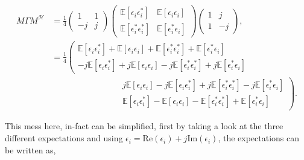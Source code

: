 \documentclass[honours,12pt]{unswthesis}
\newcommand{\E}{\mathbb{E}}
\newcommand{\ct}{\mathcal{H}}
\numberwithin{equation}{section}
\begin{document}
\begin{align*}
	M \Gamma M^{\ct} &= \frac{1}{4} \begin{pmatrix}
		1 & 1 \\
		- j & j
	\end{pmatrix}
	\begin{pmatrix}
		\E \left[
			\epsilon_{i} \epsilon_{i}^{*}
		\right] &
		\E \left[
			\epsilon_{i} \epsilon_{i}
		\right] \\
		\E \left[
			\epsilon_{i}^{*} \epsilon_{i}^{*}
		\right] &
		\E \left[
			\epsilon_{i}^{*} \epsilon_{i}
		\right]
	\end{pmatrix}
	\begin{pmatrix}
		1 & j \\
		1 & - j 
	\end{pmatrix},\\
	&= \frac{1}{4} \left( \begin{matrix}
		\E \left[
		    \epsilon_{i} \epsilon_{i}^{*}
		\right] + 
		\E \left[
		    \epsilon_{i} \epsilon_{i}
		\right] + 
		\E \left[
		    \epsilon_{i}^{*} \epsilon_{i}^{*}
		\right] +
		\E \left[
		    \epsilon_{i}^{*} \epsilon_{i}
		\right] \\
		- j \E \left[
		    \epsilon_{i} \epsilon_{i}^{*}
		\right] + 
		j \E \left[
		    \epsilon_{i} \epsilon_{i}
		\right] - 
		j \E \left[
		    \epsilon_{i}^{*} \epsilon_{i}^{*}
		\right] +
		j \E \left[
		    \epsilon_{i}^{*} \epsilon_{i}
		\right]
		\end{matrix}\right.\\
		&\qquad \qquad \qquad \qquad \left. \begin{matrix}
		j \E \left[
		    \epsilon_{i} \epsilon_{i}
		\right] - 
		j \E \left[
		    \epsilon_{i} \epsilon_{i}^{*}
		\right] + 
		j \E \left[
		    \epsilon_{i}^{*} \epsilon_{i}^{*}
		\right] -
		j \E \left[
		    \epsilon_{i}^{*} \epsilon_{i}
		\right] \\
		\E \left[
		    \epsilon_{i} \epsilon_{i}^{*}
		\right] -
		\E \left[
		    \epsilon_{i} \epsilon_{i}
		\right] -
		\E \left[
		    \epsilon_{i}^{*} \epsilon_{i}^{*}
		\right] +
		\E \left[
		    \epsilon_{i}^{*} \epsilon_{i}
		\right]
	\end{matrix} \right).
\end{align*}

\noindent This mess here, in-fact can be simplified, first by taking a look at the three different expectations and using $\epsilon_{i} = \text{Re} \left( \epsilon_{i} \right) + j \text{Im} \left( \epsilon_{i} \right)$, the expectations can be written as,
\end{document}
